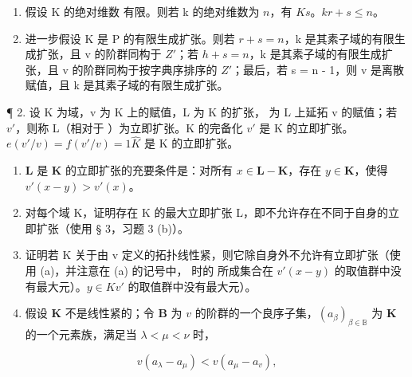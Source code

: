 \begin{enumerate}
\def\labelenumi{(\alph{enumi})}
\item
  假设 K 的绝对维数  有限。则若 k 的绝对维数为 \(n\)，有 \(K\)\(s\)。\(k\)\(r + s \leqslant n\)。
\item
  进一步假设 K 是 P 的有限生成扩张。则若 \(r + s = n\)，k 是其素子域的有限生成扩张，且 v 的阶群同构于 \(Z'\)；若 \(h + s = n\)，k 是其素子域的有限生成扩张，且 v 的阶群同构于按字典序排序的 \(Z'\)；最后，若 s = n - 1，则 v 是离散赋值，且 k 是其素子域的有限生成扩张。
\end{enumerate}

¶ 2. 设 K 为域，v 为 K 上的赋值，L 为 K 的扩张， 为 L 上延拓 v 的赋值；若 \(v'\)，则称 L（相对于 ）为立即扩张。K 的完备化 \(v'\) 是 K 的立即扩张。\(e(v'/v) = f(v'/v) = 1\)\(\hat{K}\) 是 K 的立即扩张。

\begin{enumerate}
\def\labelenumi{(\alph{enumi})}
\item
  \(\mathbf{L}\) 是 \(\mathbf{K}\) 的立即扩张的充要条件是：对所有 \(x \in \mathbf{L} - \mathbf{K}\)，存在 \(y \in \mathbf{K}\)，使得 \(v'(x - y) > v'(x)\)。
\item
  对每个域 K，证明存在 K 的最大立即扩张 L，即不允许存在不同于自身的立即扩张（使用 § 3，习题 3 (b)）。
\item
  证明若 K 关于由 v 定义的拓扑线性紧，则它除自身外不允许有立即扩张（使用 (a)，并注意在 (a) 的记号中， 时的  所成集合在 \(v'(x - y)\) 的取值群中没有最大元）。\(y \in K\)\(v'\) 的取值群中没有最大元）。
\item
  假设 \(\mathbf{K}\) 不是线性紧的；令 \(\mathbf{B}\) 为 \(v\) 的阶群的一个良序子集，\((a_{\beta})_{\beta \in \mathbb{B}}\) 为 \(\mathbf{K}\) 的一个元素族，满足当 \(\lambda < \mu < \nu\) 时，
\end{enumerate}

\[
v (a _ {\lambda} - a _ {\mu}) <   v (a _ {\mu} - a _ {v}),
\]


